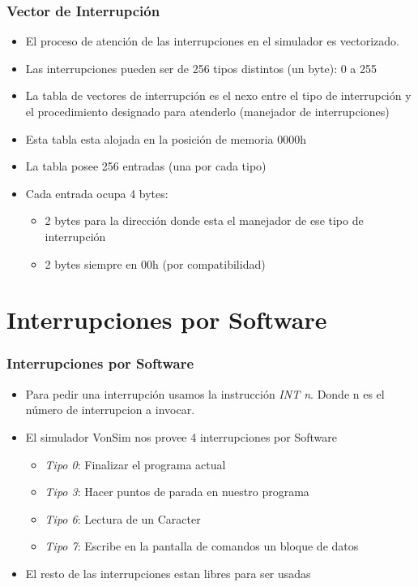 \documentclass{beamer}
\begin{document}
\begin{frame}
\frametitle{Vector de Interrupción}
\begin{itemize}
  \item El proceso de atención de las interrupciones en el simulador es vectorizado.
  \item Las interrupciones pueden ser de 256 tipos distintos (un byte): 0 a 255
  \item La tabla de vectores de interrupción es el nexo entre el tipo de interrupción y el procedimiento designado para atenderlo (manejador de interrupciones)
  \item Esta tabla esta alojada en la posición de memoria 0000h
  \item La tabla posee 256 entradas (una por cada tipo)
  \item Cada entrada ocupa 4 bytes: 
  \begin {itemize}
  \item 2 bytes para la dirección donde esta el manejador de ese tipo de interrupción 
  \item 2 bytes siempre en 00h (por compatibilidad)
\end{itemize}
\end{itemize}

\end{frame}


\section{Interrupciones por Software}
\begin{frame}
\frametitle{Interrupciones por Software}

\begin{itemize}
 \item Para pedir una interrupción usamos la instrucción \emph{INT n}. Donde n es el número de interrupcion a invocar.
 \item El simulador VonSim nos provee 4 interrupciones por Software
 \begin{itemize}
   \item \emph{Tipo 0}: Finalizar el programa actual
   \item \emph{Tipo 3}: Hacer puntos de parada en nuestro programa 
   \item \emph{Tipo 6}: Lectura de un Caracter
   \item \emph{Tipo 7}: Escribe en la pantalla de comandos un bloque de datos
 \end{itemize}
 \item El resto de las interrupciones estan libres para ser usadas
\end{itemize}
\end{frame}
\end{document}
